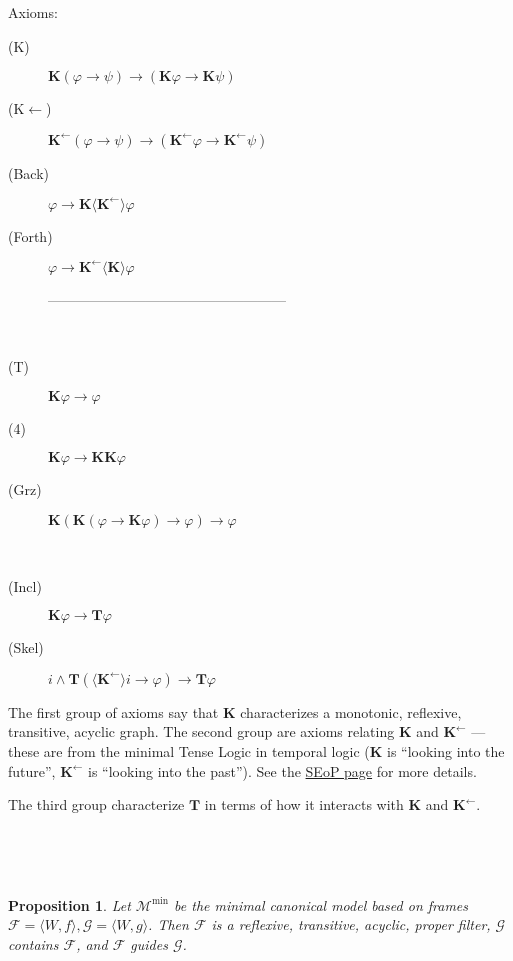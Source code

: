 \documentclass{article}
\newcommand{\tmmathbf}[1]{\ensuremath{\boldsymbol{#1}}}
\newtheorem{proposition}{Proposition}
\newcommand{\Model}{\ensuremath{\mathcal{M}}}
\newcommand{\Know}{\tmmathbf{\text{K}}}
\newcommand{\Knownby}{\tmmathbf{\text{K}^{\leftarrow}}}
\newcommand{\diaKnow}{\langle \tmmathbf{\text{K}} \rangle}
\newcommand{\diaKnownby}{\langle \tmmathbf{\text{K}^{\leftarrow}} \rangle}
\newcommand{\Typ}{\tmmathbf{\text{T}}}
\begin{document}
Axioms:
\begin{description}
  \item[(K)] $\Know (\varphi \rightarrow \psi) \rightarrow \left( \Know
  \varphi \rightarrow \Know \psi \right)$
  
  \item[(K$\leftarrow$)] $\Knownby (\varphi \rightarrow \psi) \rightarrow
  \left( \Knownby \varphi \rightarrow \Knownby \psi \right)$
  
  \item[(Back)] $\varphi \rightarrow \Know \diaKnownby \varphi$
  
  \item[(Forth)] $\varphi \rightarrow \Knownby \diaKnow \varphi$
  
  ---------------------------------------------------
  
  \
  
  \item[(T)] $\Know \varphi \rightarrow \varphi$
  
  \item[(4)] $\Know \varphi \rightarrow \Know \Know \varphi$
  
  \item[(Grz)] $\Know \left( \Know \left( \varphi \rightarrow \Know \varphi
  \right) \rightarrow \varphi \right) \rightarrow \varphi$
  
  \
  
  \item[(Incl)] $\Know \varphi \rightarrow \Typ \varphi$
  
  \item[(Skel)] $i \wedge \Typ \left( \diaKnownby i \rightarrow \varphi
  \right) \rightarrow \Typ \varphi$
\end{description}


The first group of axioms say that $\Know$ characterizes a monotonic,
reflexive, transitive, acyclic graph. The second group are axioms relating
$\Know$ and $\Knownby$ --- these are from the minimal Tense Logic in temporal
logic ($\Know$ is ``looking into the future'', $\Knownby$ is ``looking into
the past''). See the
\href{https://plato.stanford.edu/entries/logic-temporal/}{SEoP page} for more
details.

The third group characterize $\Typ$ in terms of how it interacts with $\Know$
and $\Knownby$.

\

\

\begin{proposition}
  Let $\Model^{\min}$ be the minimal canonical model based on frames
  $\mathcal{F} = \langle W, f \rangle, \mathcal{G} = \langle W, g \rangle$.
  Then $\mathcal{F}$ is a reflexive, transitive, acyclic, proper filter,
  $\mathcal{G}$ contains $\mathcal{F}$, and $\mathcal{F}$ guides
  $\mathcal{G}$.
\end{proposition}
\end{document}
